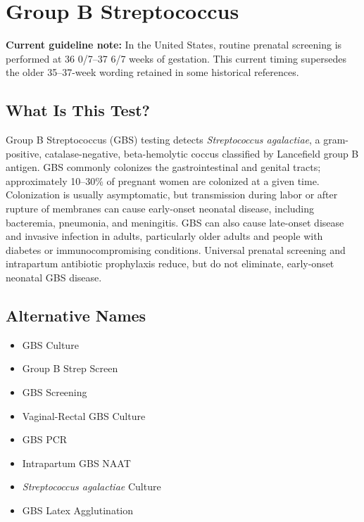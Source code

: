 \chapter{Group B Streptococcus}

\textbf{Current guideline note:} In the United States, routine prenatal screening is performed at 36 0/7--37 6/7 weeks of gestation. This current timing supersedes the older 35--37-week wording retained in some historical references.

\section*{What Is This Test?}
Group B Streptococcus (GBS) testing detects \textit{Streptococcus agalactiae}, a gram-positive, catalase-negative, beta-hemolytic coccus classified by Lancefield group B antigen. GBS commonly colonizes the gastrointestinal and genital tracts; approximately 10--30\% of pregnant women are colonized at a given time. Colonization is usually asymptomatic, but transmission during labor or after rupture of membranes can cause early-onset neonatal disease, including bacteremia, pneumonia, and meningitis. GBS can also cause late-onset disease and invasive infection in adults, particularly older adults and people with diabetes or immunocompromising conditions. Universal prenatal screening and intrapartum antibiotic prophylaxis reduce, but do not eliminate, early-onset neonatal GBS disease.

\section*{Alternative Names}
\begin{itemize}
  \item GBS Culture
  \item Group B Strep Screen
  \item GBS Screening
  \item Vaginal-Rectal GBS Culture
  \item GBS PCR
  \item Intrapartum GBS NAAT
  \item \textit{Streptococcus agalactiae} Culture
  \item GBS Latex Agglutination
\end{itemize}

